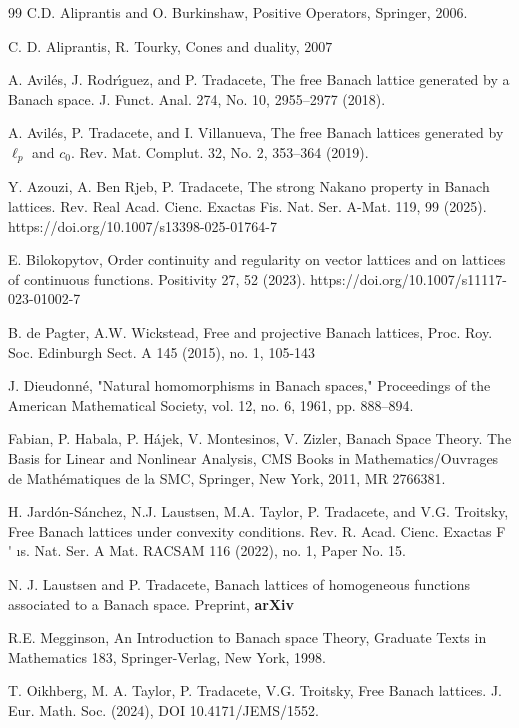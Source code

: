 \documentclass[12pt]{article}%
\providecommand{\U}[1]{\protect\rule{.1in}{.1in}}
\begin{document}
\begin{thebibliography}{99}                                                                                               %
C.D. Aliprantis and O. Burkinshaw, Positive Operators,
Springer, 2006.

C. D. Aliprantis, R. Tourky, Cones and duality, $2007$

A. Avil\'{e}s, J. Rodr\'{\i}guez, and P. Tradacete, The free
Banach lattice generated by a Banach space. J. Funct. Anal. 274, No. 10,
2955--2977 (2018).

A. Avil\'{e}s, P. Tradacete, and I. Villanueva, The free
Banach lattices generated by $\ell_{p}$ and $c_{0}$. Rev. Mat. Complut. 32,
No. 2, 353--364 (2019).

Y. Azouzi, A. Ben Rjeb, P. Tradacete, The strong Nakano
property in Banach lattices. Rev. Real Acad. Cienc. Exactas Fis. Nat. Ser.
A-Mat. 119, 99 (2025). https://doi.org/10.1007/s13398-025-01764-7

E. Bilokopytov, Order continuity and regularity on vector
lattices and on lattices of continuous functions. Positivity 27, 52 (2023). https://doi.org/10.1007/s11117-023-01002-7

B. de Pagter, A.W. Wickstead, Free and projective Banach
lattices, Proc. Roy. Soc. Edinburgh Sect. A 145 (2015), no. 1, 105-143

J. Dieudonn\'{e}, "Natural homomorphisms in Banach spaces,"
Proceedings of the American Mathematical Society, vol. 12, no. 6, 1961, pp. 888--894.

Fabian, P. Habala, P. H\'{a}jek, V. Montesinos, V. Zizler,
Banach Space Theory. The Basis for Linear and Nonlinear Analysis, CMS Books in
Mathematics/Ouvrages de Math\'{e}matiques de la SMC, Springer, New York, 2011,
MR 2766381.

H. Jard\'{o}n-S\'{a}nchez, N.J. Laustsen, M.A. Taylor, P.
Tradacete, and V.G. Troitsky, Free Banach lattices under convexity conditions.
Rev. R. Acad. Cienc. Exactas F%
\'{}%
\i s. Nat. Ser. A Mat. RACSAM 116 (2022), no. 1, Paper No. 15.

N. J. Laustsen and P. Tradacete, Banach lattices of
homogeneous functions associated to a Banach space. Preprint, \textbf{arXiv}

R.E. Megginson, An Introduction to Banach space Theory,
Graduate Texts in Mathematics 183, Springer-Verlag, New York, 1998.

T. Oikhberg, M. A. Taylor, P. Tradacete, V.G. Troitsky, Free
Banach lattices. J. Eur. Math. Soc. (2024), DOI 10.4171/JEMS/1552.
\end{thebibliography}
\end{document}
